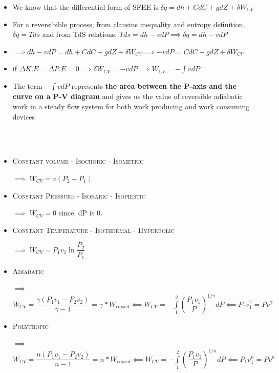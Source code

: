 \documentclass[8pt]{article}
\begin{document}
	\begin{itemize}
		\item We know that the differential form of SFEE is $\boxed{\delta q = dh + CdC + gdZ + \delta W_{CV}}$
		\item For a reversibible process, from clausius inequality and entropy definition, $\delta q = Tds$ and from TdS relations, $Tds = dh - vdP \implies \delta q = dh - vdP$
		\item $\implies dh-vdP = dh + CdC + gdZ + \delta W_{CV} \implies -vdP = CdC + gdZ + \delta W_{CV}$
		\item if $\Delta K.E = \Delta P.E = 0 \implies \delta W_{CV} = -vdP \implies W_{CV} = -\int vdP$
		\item The term $-\int vdP$ represents \textbf{the area between the P-axis and the curve on a P-V diagram} and gives us the value of reversible adiabatic work in a steady flow system for both work producing and work consuming devices
	\end{itemize}\hrulefill\\\\
	\begin{itemize}
	\item \textsc{Constant volume - Isochoric - Isometric}
		\item[$\implies$] $\boxed{W_{CV} = v(P_2-P_1)}$
	\item \textsc{Constant Pressure - Isobaric - Isopiestic}
		\item[$\implies$] $\boxed{W_{CV} = 0}$ since, dP is 0. 
	\item \textsc{Constant Temperature - Isothermal - Hyperbolic}
		\item[$\implies$] $\boxed{W_{CV} = P_1v_1\ln\dfrac{P_2}{P_1}}$
	\item \textsc{Adiabatic} 
		\item[$\implies$] $\boxed{W_{CV} = \dfrac{\gamma\left(P_1v_1-P_2v_2\right)}{\gamma -1}} = \gamma *W_{closed} \impliedby W_{CV} = -\int\limits_1^2\left(\dfrac{P_1v_1}{P}\right)^{1/\gamma}dP \impliedby \boxed{P_1v_1^\gamma = Pv^\gamma}$ 
	\item \textsc{Polytropic} 
		\item[$\implies$] $\boxed{W_{CV} = \dfrac{n\left(P_1v_1-P_2v_2\right)}{n-1}} = n*W_{closed} \impliedby W_{CV} = -\int\limits_1^2\left(\dfrac{P_1v_1}{P}\right)^{1/n}dP \impliedby \boxed{P_1v_1^n = Pv^n}$ 
	\end{itemize}\hrulefill\\\\
\end{document}
